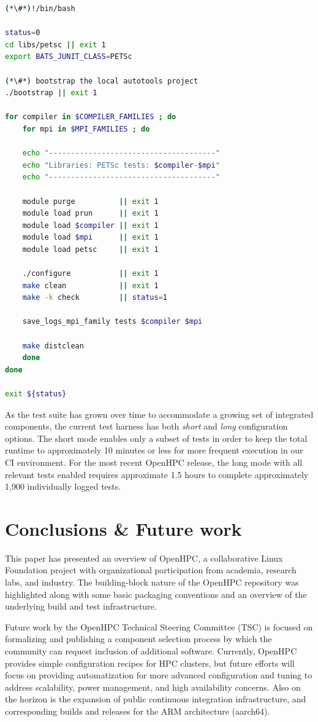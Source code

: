 \documentclass{sig-alternate-05-2015}
\begin{document}
\begin{lstlisting}[language=bash,keywords={},keepspaces]
(*\#*)!/bin/bash

status=0
cd libs/petsc || exit 1
export BATS_JUNIT_CLASS=PETSc

(*\#*) bootstrap the local autotools project 
./bootstrap || exit 1

for compiler in $COMPILER_FAMILIES ; do
    for mpi in $MPI_FAMILIES ; do

    echo "--------------------------------------"
    echo "Libraries: PETSc tests: $compiler-$mpi"
    echo "--------------------------------------"

    module purge          || exit 1
    module load prun      || exit 1
    module load $compiler || exit 1
    module load $mpi      || exit 1
    module load petsc     || exit 1

    ./configure           || exit 1
    make clean            || exit 1
    make -k check         || status=1

    save_logs_mpi_family tests $compiler $mpi

    make distclean
    done
done

exit ${status}
\end{lstlisting}

As the test suite has grown over time to accommodate a growing set of integrated
components, the current test harness has both {\em short} and {\em long}
configuration options.  The short mode enables only a subset of tests in order
to keep the total runtime to approximately 10 minutes or less for more frequent
execution in our CI environment. For the most recent OpenHPC release, the long
mode with all relevant tests enabled requires approximate 1.5 hours to complete
approximately 1,900 individually logged tests.


\section{Conclusions \& Future work}
This paper has presented an overview of OpenHPC, a collaborative Linux
Foundation project with organizational participation from academia, research
labs, and industry. The building-block nature of the OpenHPC repository was
highlighted along with some basic packaging conventions and an overview of the
underlying build and test infrastructure.

Future work by the OpenHPC Technical Steering Committee (TSC) is focused on
formalizing and publishing a component selection process by which the community
can request inclusion of additional software. Currently, OpenHPC provides simple
configuration recipes for HPC clusters, but future efforts will focus on 
providing automatization for more advanced configuration and tuning to address
scalability, power management, and high availability concerns. Also on the horizon is the
expansion of public continuous integration infrastructure, and corresponding
builds and releases for the ARM architecture (aarch64). 




\end{document}
